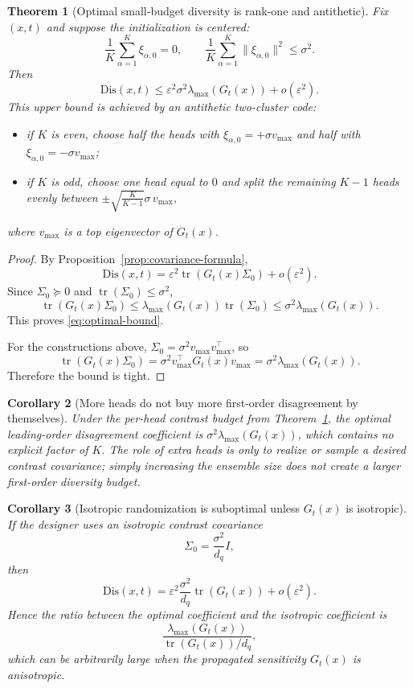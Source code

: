 \documentclass[11pt]{article}
\newcommand{\tr}{\operatorname{tr}}
\newtheorem{theorem}{Theorem}
\newtheorem{corollary}[theorem]{Corollary}
\theoremstyle{remark}
\begin{document}
\begin{theorem}[Optimal small-budget diversity is rank-one and antithetic]
\label{thm:optimal-antithetic}
Fix $(x,t)$ and suppose the initialization is centered:
\[
\frac1K\sum_{\alpha=1}^K \xi_{\alpha,0}=0,
\qquad
\frac1K\sum_{\alpha=1}^K \|\xi_{\alpha,0}\|^2 \le \sigma^2.
\]
Then
\begin{equation}
\mathrm{Dis}(x,t)
\le
\varepsilon^2 \sigma^2 \lambda_{\max}(G_t(x))
 + o(\varepsilon^2).
\label{eq:optimal-bound}
\end{equation}
This upper bound is achieved by an antithetic two-cluster code:
\begin{itemize}
\item if $K$ is even, choose half the heads with $\xi_{\alpha,0}=+\sigma v_{\max}$ and half with $\xi_{\alpha,0}=-\sigma v_{\max}$;
\item if $K$ is odd, choose one head equal to $0$ and split the remaining $K-1$ heads evenly between $\pm\sqrt{\frac{K}{K-1}}\sigma\,v_{\max}$,
\end{itemize}
where $v_{\max}$ is a top eigenvector of $G_t(x)$.
\end{theorem}

\begin{proof}
By Proposition~\ref{prop:covariance-formula},
\[
\mathrm{Dis}(x,t)
=
\varepsilon^2 \tr(G_t(x)\Sigma_0) + o(\varepsilon^2).
\]
Since $\Sigma_0 \succeq 0$ and $\tr(\Sigma_0)\le \sigma^2$,
\[
\tr(G_t(x)\Sigma_0)
\le
\lambda_{\max}(G_t(x))\tr(\Sigma_0)
\le
\sigma^2 \lambda_{\max}(G_t(x)).
\]
This proves \eqref{eq:optimal-bound}.

For the constructions above, $\Sigma_0 = \sigma^2 v_{\max}v_{\max}^\top$, so
\[
\tr(G_t(x)\Sigma_0)
=
\sigma^2 v_{\max}^\top G_t(x)v_{\max}
=
\sigma^2 \lambda_{\max}(G_t(x)).
\]
Therefore the bound is tight.
\end{proof}

\begin{corollary}[More heads do not buy more first-order disagreement by themselves]
\label{cor:no-k-gain}
Under the per-head contrast budget from Theorem~\ref{thm:optimal-antithetic}, the optimal leading-order disagreement coefficient is $\sigma^2 \lambda_{\max}(G_t(x))$, which contains no explicit factor of $K$. The role of extra heads is only to realize or sample a desired contrast covariance; simply increasing the ensemble size does not create a larger first-order diversity budget.
\end{corollary}

\begin{corollary}[Isotropic randomization is suboptimal unless $G_t(x)$ is isotropic]
\label{cor:isotropic-gap}
If the designer uses an isotropic contrast covariance
\[
\Sigma_0 = \frac{\sigma^2}{d_q} I,
\]
then
\[
\mathrm{Dis}(x,t)
=
\varepsilon^2 \frac{\sigma^2}{d_q}\tr(G_t(x))
 + o(\varepsilon^2).
\]
Hence the ratio between the optimal coefficient and the isotropic coefficient is
\[
\frac{\lambda_{\max}(G_t(x))}{\tr(G_t(x))/d_q},
\]
which can be arbitrarily large when the propagated sensitivity $G_t(x)$ is anisotropic.
\end{corollary}
\end{document}
